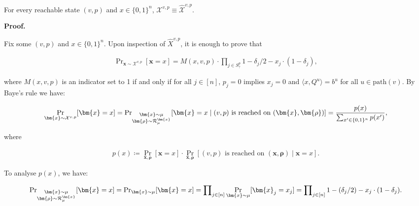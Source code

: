For every reachable state $(v,p)$ and $x\in\{0,1\}^{n}$, $\mathcal{X}^{v,p}\equiv\widehat{\mathcal{X}}^{v,p}$.\par







\par\medskip\noindent\textbf{
\textbf{Proof}.}\par




Fix some $(v,p)$ and $x\in\{0,1\}^{n}$. Upon inspection of $\widehat{X}^{v,p}$, it is enough to prove that\par


\[\begin{gathered}
\Pr\nolimits_{\bm{x}\sim\mathcal{X}^{v,p}}[\bm{x}=x]=M(x,v,p)\cdot\prod\nolimits_{j\in S^{p}_{?}}1-\delta_{j}/2-x_{j}\cdot(1-\delta_{j}),
\end{gathered}\]


where $M(x,v,p)$ is an indicator set to 1 if and only if for all $j\in[n]$, $p_{j}=0$ implies $x_{j}=0$ and $\langle x,Q^{u}\rangle=b^{u}$ for all $u\in\mathrm{path}(v)$.
By Baye’s rule we have:\par


\[\begin{gathered}
\Pr_{\bm{x}\sim\mathcal{X}^{v,p}}[\bm{x}=x]=\Pr\nolimits_{\begin{subarray}{c}\bm{x}\sim\mu\\
\bm{\rho}\sim\mathcal{R}_{\mu}^{\bm{x}}\end{subarray}}[\bm{x}=x\mid\text{$(v,p)$ is reached on $(\bm{x},\bm{\rho})$}]=\frac{p(x)}{\sum_{x^{\prime}\in\{0,1\}^{n}}p(x^{\prime})},
\end{gathered}\]


where\par


\[\begin{gathered}
p(x)\coloneqq\Pr_{\bm{x},\bm{\rho}}[\bm{x}=x]\cdot\Pr_{\bm{x},\bm{\rho}}[\text{$(v,p)$ is reached on $(\bm{x},\bm{\rho})$}\mid\bm{x}=x].
\end{gathered}\]


To analyse $p(x)$, we have:\par


\[\begin{gathered}
\Pr\nolimits_{\begin{subarray}{c}\bm{x}\sim\mu\\
\bm{\rho}\sim\mathcal{R}_{\mu}^{\bm{x}}\end{subarray}}[\bm{x}=x]=\Pr\nolimits_{\bm{x}\sim\mu}[\bm{x}=x]=\prod\nolimits_{j\in[n]}\Pr_{\bm{x}\sim\mu}[\bm{x}_{j}=x_{j}]=\prod\nolimits_{j\in[n]}1-(\delta_{j}/2)-x_{j}\cdot(1-\delta_{j}).
\end{gathered}\]


